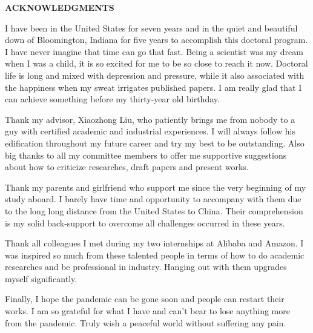 \begin{centering}
\textbf{ACKNOWLEDGMENTS}\\
\vspace{\baselineskip}
\end{centering}

I have been in the United States for seven years and in the quiet and beautiful down of Bloomington, Indiana for five years to accomplish this doctoral program. I have never imagine that time can go that fast. Being a scientist was my dream when I was a child, it is so excited for me to be so close to reach it now. Doctoral life is long and mixed with depression and pressure, while it also associated with the happiness when my sweat irrigates published papers. I am really glad that I can achieve something before my thirty-year old birthday. 

Thank my advisor, Xiaozhong Liu, who patiently brings me from nobody to a guy with certified academic and industrial experiences. I will always follow his edification throughout my future career  and try my best to be outstanding. Also big thanks to all my committee members to offer me supportive suggestions about how to criticize researches, draft papers and present works. 

Thank my parents and girlfriend who support me since the very beginning of my study aboard. I barely have time and opportunity  to accompany with them due to the long long distance from the United States to China. Their comprehension is my solid back-support to overcome all challenges occurred in these years.

Thank all colleagues I met during my two internships at Alibaba and Amazon. I was inspired so much from these talented people in terms of how to do academic researches and be professional in industry. Hanging out with them upgrades myself significantly. 

Finally, I hope the pandemic can be gone soon and people can restart their works. I am so grateful for what I have and can't bear to lose anything more from the pandemic. Truly wish a peaceful world without suffering any pain. 